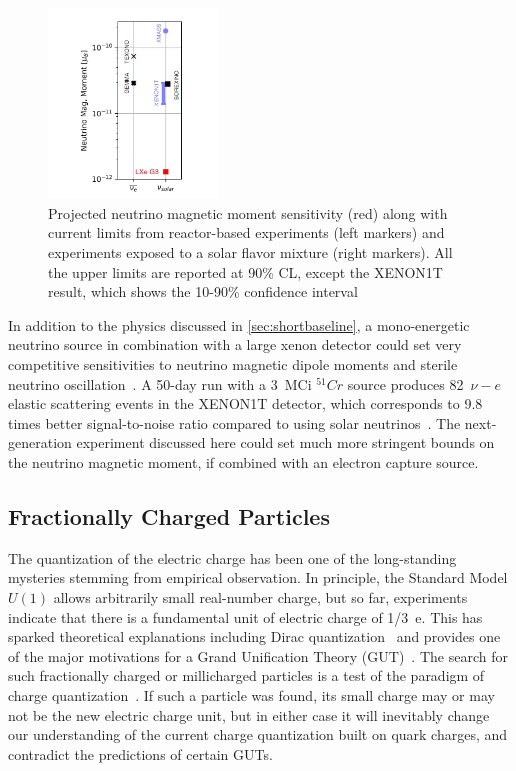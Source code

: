\begin{figure}[!htbp]
\centering
\includegraphics[width=0.4\textwidth]{fig_nu_magneticmoment_sensitivity.jpg}
\caption{\label{fig:NuMagMomSens} Projected neutrino magnetic moment sensitivity (red) along with current limits from reactor-based experiments (left markers) and experiments exposed to a solar flavor mixture (right markers). All the upper limits are reported at 90\% CL, except the XENON1T result, which shows the 10-90\% confidence interval~\cite{Abe:2020nwr,Borexino:2017fbd,Aprile:2020tmw}}
\end{figure}

In addition to the physics discussed in \autoref{sec:shortbaseline}, a mono-energetic neutrino source in combination with a large xenon detector could set very competitive sensitivities to neutrino magnetic dipole moments and sterile neutrino oscillation~\cite{Coloma:2014hka}. A 50-day run with a 3~MCi $^{51}Cr$ source produces 82~$\nu-e$ elastic scattering events in the XENON1T detector, which corresponds to 9.8 times better signal-to-noise ratio compared to using solar neutrinos~\cite{Coloma:2020voz}. The next-generation experiment discussed here could set much more stringent bounds on the neutrino magnetic moment, if combined with an electron capture source. 

\subsection{Fractionally Charged Particles}

The quantization of the electric charge has been one of the long-standing mysteries stemming from empirical observation. In principle, the Standard Model $U(1)$ allows arbitrarily small real-number charge, but so far, experiments indicate that there is a fundamental unit of electric charge of 1/3~e. This has sparked theoretical explanations including Dirac quantization~\cite{Dirac:1931kp} and provides one of the major motivations for a Grand Unification Theory (GUT)~\cite{Pati:1973uk,Georgi:1974sy}. The search for such fractionally charged or millicharged particles is a test of the paradigm of charge quantization~\cite{Dobroliubov:1989mr,Prinz:1998ua,Davidson:2000hf,Prinz:2001qz,Golowich:1986tj,Babu:1993yh,Gninenko:2006fi,CMS:2012xi,Agnese:2014vxh,Haas:2014dda,Ball:2016zrp,Alvis:2018yte,Magill:2018tbb,Kelly:2018brz,Berlin:2018bsc}. If such a particle was found, its small charge may or may not be the new electric charge unit, but in either case it will inevitably change our understanding of the current charge quantization built on quark charges, and contradict the predictions of certain GUTs.

